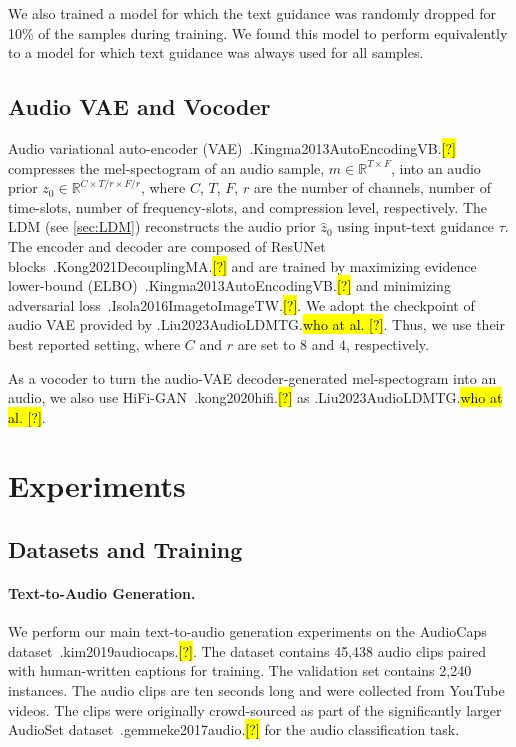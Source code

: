 \documentclass{article}
\let\realcite\cite
\renewcommand{\cite}[1]{\ifx.#1.\hl{[?]}\else\realcite{#1}\fi}
\let\realcitet\citet
\renewcommand{\citet}[1]{\ifx.#1.\hl{who at al. [?]}\else\realcitet{#1}\fi}
\begin{document}
We also trained a model for which the text guidance was randomly dropped for 10\% of the samples during training. We found this model to perform equivalently to a model for which text guidance was always used for all samples.

\subsection{Audio VAE and Vocoder}
\label{sec:VAE}

Audio variational auto-encoder (VAE)~\cite{Kingma2013AutoEncodingVB} compresses the mel-spectogram of an audio sample, $m\in \mathbb{R}^{T\times F}$, into an audio prior $z_0\in \mathbb{R}^{C\times T/r\times F/r}$, where $C$, $T$, $F$, $r$ are the number of channels, number of time-slots, number of frequency-slots, and compression level, respectively. The LDM (see \cref{sec:LDM}) reconstructs the audio prior $\hat z_0$ using input-text guidance $\tau$. 
The encoder and decoder are composed of ResUNet blocks~\cite{Kong2021DecouplingMA} and are trained by maximizing evidence lower-bound (ELBO)~\cite{Kingma2013AutoEncodingVB} and minimizing adversarial loss~\cite{Isola2016ImagetoImageTW}.
We adopt the checkpoint of audio VAE provided by \citet{Liu2023AudioLDMTG}. Thus, we use their best reported setting, where $C$ and $r$ are set to $8$ and $4$, respectively.

As a vocoder to turn the audio-VAE decoder-generated mel-spectogram into an audio, we also use HiFi-GAN~\cite{kong2020hifi} as \citet{Liu2023AudioLDMTG}.


\section{Experiments}
\label{sec:experiments}


\subsection{Datasets and Training}
\paragraph{Text-to-Audio Generation.}
We perform our main text-to-audio generation experiments on the AudioCaps dataset~\cite{kim2019audiocaps}. The dataset contains 45,438 audio clips paired with human-written captions for training. The validation set contains 2,240 instances. The audio clips are ten seconds long and were collected from YouTube videos. The clips were originally crowd-sourced as part of the significantly larger AudioSet dataset~\cite{gemmeke2017audio} for the audio classification task.
\end{document}
